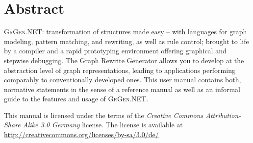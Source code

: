 \documentclass[a4paper,final,11pt]{book}
\providecommand{\GrG}{{\scshape GrGen.NET}}
\begin{document}
\chapter*{Abstract}


\noindent \textsc{GrGen.NET}: transformation of structures made easy
-- with languages for graph modeling, pattern matching, and rewriting, as well as rule control;
brought to life by a compiler and a rapid prototyping environment offering graphical and stepwise debugging.
The Graph Rewrite Generator allows you to develop at the abstraction level of graph representations, leading to applications performing comparably to conventionally developed ones.
This user manual contains both, normative statements in the sense of a reference manual as well as an informal guide to the features and usage of \GrG.\\[6ex]

\vspace{13cm}

\noindent This manual is licensed under the terms of the \emph{Creative Commons Attribution-Share Alike 3.0 Germany}
license.  The license is available at
\url{http://creativecommons.org/licenses/by-sa/3.0/de/}



\clearpage

\tableofcontents






\end{document}
